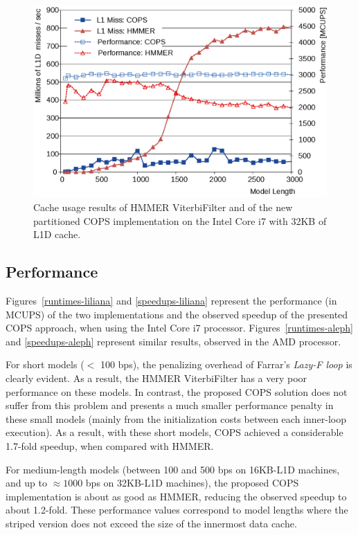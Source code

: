 \documentclass{bmcart}
\begin{document}
\begin{figure}[!b]
  \centering
  \includegraphics{img/cache.eps} 
  \caption{Cache usage results of HMMER ViterbiFilter and of the new partitioned COPS implementation on the Intel Core i7 with 32KB of L1D cache.}
  \label{cache-misses-part}
\end{figure}

\subsection*{Performance}

Figures~\ref{runtimes-liliana} and \ref{speedups-liliana} represent the performance (in \ac{MCUPS}) of the two implementations and the observed speedup of the presented \ac{COPS} approach, when using the Intel Core i7 processor. Figures~\ref{runtimes-aleph} and \ref{speedups-aleph} represent similar results, observed in the AMD processor.

For short models ($<$ 100 bps), the penalizing overhead of Farrar's \textit{Lazy-F loop} is clearly evident. As a result, the HMMER ViterbiFilter has a very poor performance on these models. In contrast, the proposed COPS solution does not suffer from this problem and presents a much smaller performance penalty in these small models (mainly from the initialization costs between each inner-loop execution). As a result, with these short models, \ac{COPS} achieved a considerable 1.7-fold speedup, when compared with HMMER.
 
For medium-length models (between 100 and 500 bps on 16KB-\ac{L1D} machines, and up to ${\approx}1000$ bps on 32KB-\ac{L1D} machines), the proposed \ac{COPS} implementation is about as good as HMMER, reducing the observed speedup to about 1.2-fold. These performance values correspond to model lengths where the striped version does not exceed the size of the innermost data cache.
\end{document}
